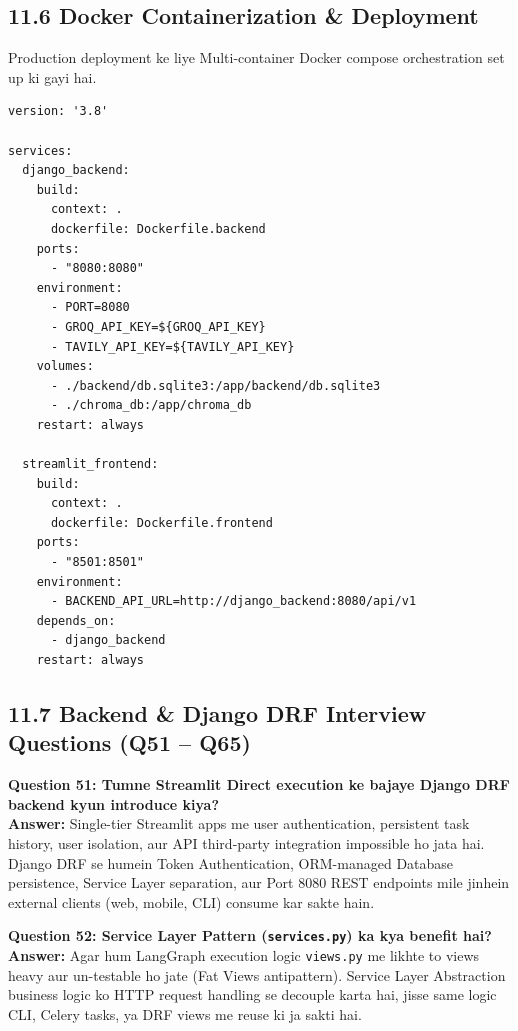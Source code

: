 \documentclass[12pt, a4paper]{article}
\begin{document}
\clearpage
\subsection{11.6 Docker Containerization \& Deployment}

Production deployment ke liye Multi-container Docker compose orchestration set up ki gayi hai.

\begin{lstlisting}[style=bashstyle, caption={docker-compose.yml --- Production Orchestration}]
version: '3.8'

services:
  django_backend:
    build:
      context: .
      dockerfile: Dockerfile.backend
    ports:
      - "8080:8080"
    environment:
      - PORT=8080
      - GROQ_API_KEY=${GROQ_API_KEY}
      - TAVILY_API_KEY=${TAVILY_API_KEY}
    volumes:
      - ./backend/db.sqlite3:/app/backend/db.sqlite3
      - ./chroma_db:/app/chroma_db
    restart: always

  streamlit_frontend:
    build:
      context: .
      dockerfile: Dockerfile.frontend
    ports:
      - "8501:8501"
    environment:
      - BACKEND_API_URL=http://django_backend:8080/api/v1
    depends_on:
      - django_backend
    restart: always
\end{lstlisting}

\clearpage
\subsection{11.7 Backend \& Django DRF Interview Questions (Q51 -- Q65)}

\begin{notebox}
\textbf{Question 51: Tumne Streamlit Direct execution ke bajaye Django DRF backend kyun introduce kiya?}\\
\textbf{Answer:} Single-tier Streamlit apps me user authentication, persistent task history, user isolation, aur API third-party integration impossible ho jata hai. Django DRF se humein Token Authentication, ORM-managed Database persistence, Service Layer separation, aur Port 8080 REST endpoints mile jinhein external clients (web, mobile, CLI) consume kar sakte hain.
\end{notebox}

\begin{notebox}
\textbf{Question 52: Service Layer Pattern (\texttt{services.py}) ka kya benefit hai?}\\
\textbf{Answer:} Agar hum LangGraph execution logic \texttt{views.py} me likhte to views heavy aur un-testable ho jate (Fat Views antipattern). Service Layer Abstraction business logic ko HTTP request handling se decouple karta hai, jisse same logic CLI, Celery tasks, ya DRF views me reuse ki ja sakti hai.
\end{notebox}
\end{document}
